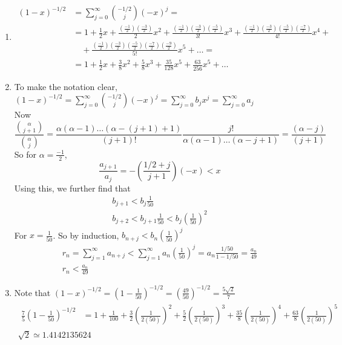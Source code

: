 \documentclass[twoside]{amsart}
\theoremstyle{plain}
\theoremstyle{definition}
\newcommand{\exercisehead}[1]
  {\smallskip
   \noindent{\small\bf Exercise #1.}}
\begin{document}
\exercisehead{20}
\begin{enumerate}
\item 
\[
\begin{aligned}
  (1-x)^{-1/2} & = \sum_{j=0}^{\infty} \binom{ -1/2}{j} (-x)^j  = \\
  & = 1 + \frac{1}{2}x + \frac{ \left( \frac{-1}{2} \right) \left( \frac{-3}{2} \right) }{2} x^2 + \frac{ \left( \frac{-1}{2} \right) \left( \frac{-3}{2} \right) \left( \frac{-5}{2} \right) }{ 3! } x^3 + \frac{ \left( \frac{-1}{2} \right) \left( \frac{-3}{2} \right) \left( \frac{-5}{2} \right) \left( \frac{-7}{2} \right) }{ 4! } x^4 + \\
  & \quad + \frac{ \left( \frac{-1}{2} \right) \left( \frac{-3}{2} \right) \left( \frac{-5}{2} \right) \left( \frac{-7}{2} \right) \left( \frac{-9}{2} \right)}{5! } x^5 + \dots = \\
  & = 1 + \frac{1}{2} x + \frac{3}{8} x^2 + \frac{5}{8} x^3 + \frac{35}{128} x^5 + \frac{63}{256} x^5 + \dots
\end{aligned}
\]
\item To make the notation clear, $(1-x)^{-1/2} = \sum_{j=0}^{\infty} \binom{ -1/2}{j} (-x)^j = \sum_{j=0}^{\infty} b_j x^j = \sum_{j=0}^{\infty} a_j$ \medskip \\
Now
\[
\frac{ \binom{\alpha}{j+1} }{ \binom{\alpha}{j} } = \frac{ \alpha (\alpha -1) \dots ( \alpha - (j+1)+1) }{ (j+1)! } \frac{j!}{ \alpha(\alpha - 1 ) \dots (\alpha -j +1) } = \frac{ (\alpha - j)}{ (j+1) }
\]
So for $\alpha = \frac{-1}{2}$, 
\[
\frac{ a_{j+1}}{a_j} = - \left( \frac{ 1/2 + j }{ j+1} \right) (-x) < x 
\]
Using this, we further find that 
\[
\begin{gathered}
  b_{j+1} < b_j \frac{1}{50} \\
b_{j+2} < b_{j+1} \frac{1}{50} < b_j \left( \frac{1}{50} \right)^2 
\end{gathered}
\]
For  $x = \frac{1}{50}$.  So by induction, $b_{n+j} < b_n \left( \frac{1}{50} \right)^j$ 
\[
\begin{gathered}
  r_n = \sum_{j=1}^{\infty} a_{n+j} < \sum_{j=1}^{\infty} a_n \left( \frac{1}{50} \right)^j = a_n \frac{ 1/50}{ 1 - 1/50} = \frac{ a_n}{49} \\
\boxed{  r_n < \frac{a_n}{49} }
\end{gathered}
\]
\item Note that $\left( 1 - x \right)^{-1/2} = \left( 1 - \frac{1}{50} \right)^{-1/2} = \left( \frac{49}{50} \right)^{-1/2} = \frac{5\sqrt{2}}{7} $
\[
\begin{gathered}
  \begin{aligned}
    \frac{7}{5} \left( 1 - \frac{1}{50} \right)^{-1/2} & = 1 + \frac{1}{100} + \frac{3}{2} \left( \frac{1}{2(50)} \right)^2 + \frac{5}{2} \left( \frac{1}{ 2(50)} \right)^3 + \frac{35}{8} \left( \frac{1}{2 (50)} \right)^4 + \frac{63}{8} \left( \frac{1}{ 2(50) } \right)^5 
  \end{aligned}\\ 
\boxed{  \sqrt{2} \simeq 1.4142135624 }
\end{gathered}
\]
\end{enumerate}
\end{document}
